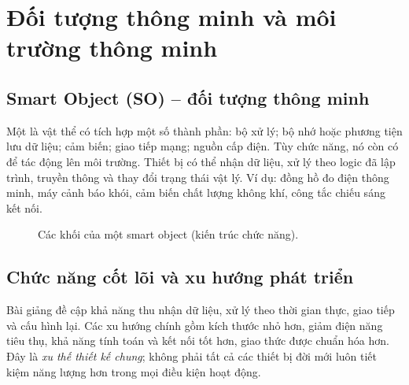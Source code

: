 \section{Đối tượng thông minh và môi trường thông minh}
\subsection{Smart Object (SO) -- đối tượng thông minh}
Một  là vật thể có tích hợp một số thành phần: bộ xử lý; bộ nhớ hoặc phương tiện lưu dữ liệu; cảm biến; giao tiếp mạng; nguồn cấp điện. Tùy chức năng, nó còn có  để tác động lên môi trường. Thiết bị có thể nhận dữ liệu, xử lý theo logic đã lập trình, truyền thông và thay đổi trạng thái vật lý. Ví dụ: đồng hồ đo điện thông minh, máy cảnh báo khói, cảm biến chất lượng không khí, công tắc chiếu sáng kết nối.

\begin{figure}[H]\centering
{}\caption{Các khối của một smart object (kiến trúc chức năng).}
\end{figure}

\subsection{Chức năng cốt lõi và xu hướng phát triển}
Bài giảng đề cập khả năng thu nhận dữ liệu, xử lý theo thời gian thực, giao tiếp và cấu hình lại. Các xu hướng chính gồm kích thước nhỏ hơn, giảm điện năng tiêu thụ, khả năng tính toán và kết nối tốt hơn, giao thức được chuẩn hóa hơn. Đây là \textit{xu thế thiết kế chung}; không phải tất cả các thiết bị đời mới luôn tiết kiệm năng lượng hơn trong mọi điều kiện hoạt động.

